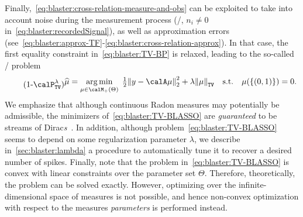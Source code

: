 \mynewline
Finally,~\cref{eq:blaster:cross-relation-measure-and-obs} can be exploited to take into account noise during the measurement process (\ie/,  $n_i\neq0$ in~\cref{eq:blaster:recordedSignal}), as well as approximation errors  (see~\cref{eq:blaster:approx-TF}-\cref{eq:blaster:cross-relation-approx}).
In that case, the first equality constraint in~\eqref{eq:blaster:TV-BP} is relaxed, leading to the so-called \BLASSO/ problem
\begin{equation}
    \stepcounter{equation}
    \tag{\theequation-$\calP^\lambda_\mathtt{TV}$}
    \label{eq:blaster:TV-BLASSO}
    \begin{split}
    \widehat{\mu}
    =
    \kargmin_{\mu \in\posDisRadonMeasure}
    \;
    \tfrac{1}{2} \kvvbar{
        y - \opObs\mu
    }_2^2
    +
    \lambda\normTV{
        \mu
    }
    \quad
    \text{s.t.}
    \quad
    \mu(\{(0, 1)\}) = 0
    .
    \end{split}
\end{equation}
We emphasize that although continuous Radon measures may potentially be admissible, the minimizers of~\cref{eq:blaster:TV-BLASSO} are \emph{guaranteed} to be streams of Dirac\textit{s}~.
In addition, although problem~\cref{eq:blaster:TV-BLASSO} seems to depend on some regularization parameter $\lambda$, we describe in~\cref{sec:blaster:lambda} a procedure to automatically tune it to recover a desired number of spikes.
Finally, note that the problem in~\cref{eq:blaster:TV-BLASSO} is convex with linear constraints over the parameter set $\Theta$.
Therefore, theoretically, the problem can be solved exactly.
However, optimizing over the infinite-dimensional space of measures is not possible, and hence non-convex optimization with respect to the measures \textit{parameters} is performed instead.

